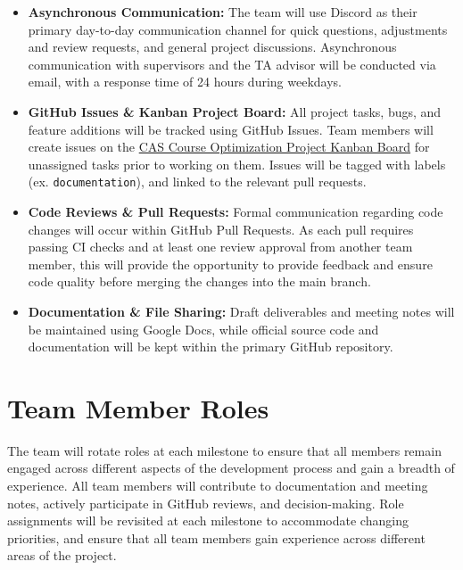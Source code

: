 \documentclass{article}
\begin{document}
\begin{itemize}
    \item \textbf{Asynchronous Communication:} The team will use Discord as their primary day-to-day 
    communication channel for quick questions, adjustments and review requests, and general project discussions. 
    Asynchronous communication with supervisors and the TA advisor will be conducted via email, with a response time of 24 hours during weekdays.
    
    \item \textbf{GitHub Issues \& Kanban Project Board:} All project tasks, bugs, and feature additions will be tracked using GitHub Issues. 
    Team members will create issues on the \href{https://github.com/users/shivyam/projects/5}{CAS Course Optimization Project Kanban Board} for unassigned tasks 
    prior to working on them. Issues will be tagged with labels (ex. \texttt{documentation}), and linked to the relevant pull requests.
    
    \item \textbf{Code Reviews \& Pull Requests:} Formal communication regarding code changes will occur within GitHub Pull Requests. 
    As each pull requires passing CI checks and at least one review approval from another team member, this will provide the opportunity to provide feedback and 
    ensure code quality before merging the changes into the main branch.
    
    \item \textbf{Documentation \& File Sharing:} Draft deliverables and meeting notes will be maintained using Google Docs, 
    while official source code and documentation will be kept within the primary GitHub repository.
\end{itemize}

\section{Team Member Roles}

The team will rotate roles at each milestone to ensure that all members remain engaged across different aspects of the development process and gain a breadth of experience. All team members will contribute to documentation and meeting notes, actively participate in GitHub reviews, and decision-making. Role assignments will be revisited at each milestone to accommodate changing priorities, and ensure that all team members gain experience across different areas of the project.
\end{document}
